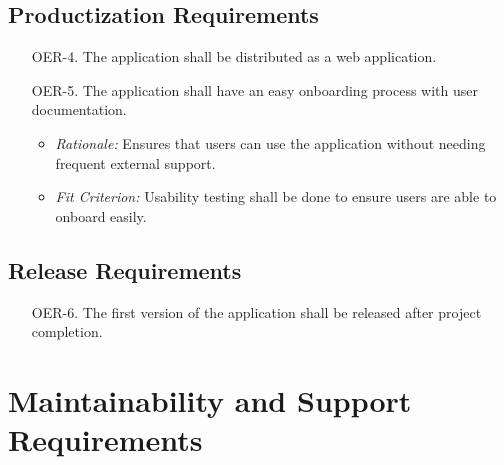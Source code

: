 \documentclass[12pt]{article}
\begin{document}
\subsection{Productization Requirements}
\begin{enumerate}
  \item[OER-4.] The application shall be distributed as a web application.
  \item[OER-5.] The application shall have an easy onboarding process with user documentation.
  \begin{itemize}
    \item \textit{Rationale:} Ensures that users can use the application without needing frequent external support.
    \item \textit{Fit Criterion:} Usability testing shall be done to ensure users are able to onboard easily.
  \end{itemize}
\end{enumerate}

\subsection{Release Requirements}
\begin{enumerate}
  \item[OER-6.] The first version of the application shall be released after project completion.
\end{enumerate}

\section{Maintainability and Support Requirements}
\end{document}

